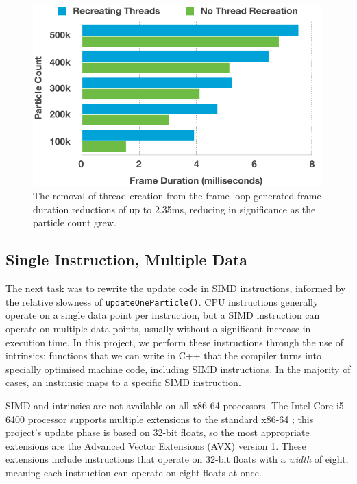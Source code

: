 \documentclass[11pt, a4paper, twocolumn]{article}
\begin{document}
\begin{figure}[h]
\includegraphics[width=\linewidth]{recreate-no-recreation}
\caption{The removal of thread creation from the frame loop generated frame duration reductions of up to 2.35ms, reducing in significance as the particle count grew.}
\label{fig:recreate-no-recreation}
\end{figure}

\subsection{Single Instruction, Multiple Data} \label{sec:simd}

The next task was to rewrite the update code in SIMD instructions, informed by the relative slowness of \verb|updateOneParticle()|. CPU instructions generally operate on a single data point per instruction, but a SIMD instruction can operate on multiple data points, usually without a significant increase in execution time. In this project, we perform these instructions through the use of intrinsics; functions that we can write in C++ that the compiler turns into specially optimised machine code, including SIMD instructions. In the majority of cases, an instrinsic maps to a specific SIMD instruction.

SIMD and intrinsics are not available on all x86-64 processors. The Intel Core i5 6400 processor supports multiple extensions to the standard x86-64 \citep{Corei56400}; this project's update phase is based on 32-bit floats, so the most appropriate extensions are the Advanced Vector Extensions (AVX) version 1. These extensions include instructions that operate on 32-bit floats with a \emph{width} of eight, meaning each instruction can operate on eight floats at once.
\end{document}
